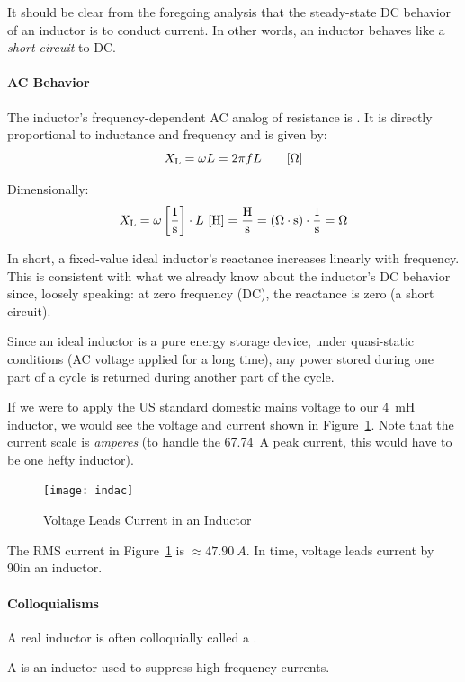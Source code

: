 \documentclass[11pt]{article}
\newcommand*\gL{4~\unit{mH}\xspace}
\newcommand*\giLm{47.90~\unit{A}\xspace}
\newcommand*\giLp{67.74~\unit{A}\xspace}
\begin{document}
It should be clear from the foregoing analysis that the steady-state
DC behavior of an inductor is to conduct current. In other words, an
inductor behaves like a \emph{short circuit} to DC.


\paragraph{AC Behavior}

The inductor's frequency-dependent AC analog of resistance is
. It is directly proportional to inductance
and frequency and is given by:
\[
X_\mathrm{L} = \omega L = 2\pi f L\qquad\bunit{\Omega}
\]

Dimensionally:
\[
X_\mathrm{L} = \omega\bunit{1}{s}\cdot L~\bunit{H} = \unit{H}{s} = \left(\unit{\Omega\cdot s}\right)\cdot\unit{1}{s} = \unit{\Omega}
\]

In short, a fixed-value ideal inductor's reactance increases linearly
with frequency. This is consistent with what we already know about the
inductor's DC behavior since, loosely speaking: at zero frequency
(DC), the reactance is zero (a short circuit).

Since an ideal inductor is a pure energy storage device, under
quasi-static conditions (AC voltage applied for a long time), any
power stored during one part of a cycle is returned during another
part of the cycle.

If we were to apply the US standard domestic mains voltage to our
\gL inductor, we would see the voltage and current shown in
Figure~\ref{fig:indac}. Note that the current scale is \emph{amperes}
(to handle the \giLp peak current, this would have to be one
hefty inductor).

\begin{figure}
  \centering
  \texttt{[image: indac]}
  \caption{Voltage Leads Current in an Inductor}
  \label{fig:indac}
\end{figure}

The RMS current in Figure~\ref{fig:indac} is $\approx\giLm$. In time,
voltage leads current by 90\deg in an inductor.

\paragraph{Colloquialisms}

A real inductor is often colloquially called a . 

A  is an inductor used to suppress high-frequency
currents.
\end{document}
